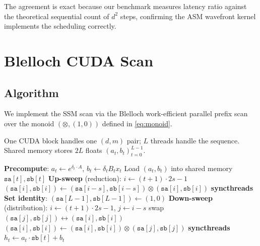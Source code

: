 \documentclass[10pt,twocolumn]{article}
\begin{document}
The agreement is exact because our benchmark measures latency ratio against
the theoretical sequential count of $d^2$ steps, confirming the ASM
wavefront kernel implements the scheduling correctly.

\section{Blelloch CUDA Scan}
\label{sec:blelloch}

\subsection{Algorithm}

We implement the SSM scan via the Blelloch work-efficient
parallel prefix scan~\cite{blelloch1990,harris2007gpu} over the
monoid $(\otimes, (1,0))$ defined in \eqref{eq:monoid}.

One CUDA block handles one $(d, m)$ pair; $L$ threads handle the sequence.
Shared memory stores $2L$ floats $(a_t, b_t)_{t=0}^{L-1}$.

\begin{algorithm}[H]
\caption{Blelloch SSM Scan (one block, one $(d,m)$ pair)}
\label{alg:blelloch}
\begin{algorithmic}[1]
\State \textbf{Precompute}: $a_t \leftarrow e^{\delta_t \cdot A}$, $b_t \leftarrow \delta_t B_t x_t$ \hfill {}
\State Load $(a_t, b_t)$ into shared memory $\mathtt{sa}[t], \mathtt{sb}[t]$
\State \textbf{Up-sweep} (reduction):
  \State $i \leftarrow (t+1)\cdot 2s - 1$
   $(\mathtt{sa}[i], \mathtt{sb}[i]) \leftarrow (\mathtt{sa}[i{-}s], \mathtt{sb}[i{-}s]) \otimes (\mathtt{sa}[i], \mathtt{sb}[i])$ \EndIf
  \State \textbf{syncthreads}
\EndFor
\State \textbf{Set identity}: $(\mathtt{sa}[L{-}1], \mathtt{sb}[L{-}1]) \leftarrow (1, 0)$
\State \textbf{Down-sweep} (distribution):
  \State $i \leftarrow (t+1)\cdot 2s - 1$, $j \leftarrow i - s$
    \State swap $(\mathtt{sa}[j], \mathtt{sb}[j]) \leftrightarrow (\mathtt{sa}[i], \mathtt{sb}[i])$
    \State $(\mathtt{sa}[i], \mathtt{sb}[i]) \leftarrow (\mathtt{sa}[i], \mathtt{sb}[i]) \otimes (\mathtt{sa}[j], \mathtt{sb}[j])$
  \EndIf
  \State \textbf{syncthreads}
\EndFor
\State $h_t \leftarrow a_t \cdot \mathtt{sb}[t] + b_t$ \hfill {}
\end{algorithmic}
\end{algorithm}
\end{document}
